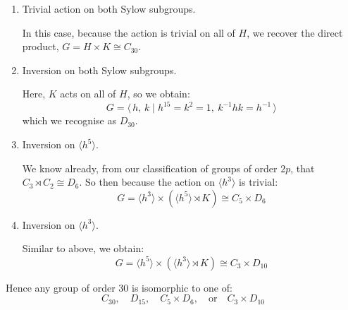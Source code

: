 \begin{enumerate}
    \item Trivial action on both Sylow subgroups.

        In this case, because the action is trivial on all of \(H\), we recover the direct product, \(G = H \times K
        \cong C_{30}\).

    \item Inversion on both Sylow subgroups.

        Here, \(K\) acts on all of \(H\), so we obtain:
        \[G = \langle\, h,\,k \mid h^{15} = k^2 = 1,\ k^{-1}hk = h^{-1}\,\rangle\]
        which we recognise as \(D_{30}\).

    \item Inversion on \(\langle h^5 \rangle\).

        We know already, from our classification of groups of order \(2p\), that \(C_3 \rtimes C_2 \cong D_6\).
        So then because the action on \(\langle h^3 \rangle\) is trivial:
        \[G = \langle h^3 \rangle \times (\langle h^5 \rangle \rtimes K) \cong C_5 \times D_6\]

    \item Inversion on \(\langle h^3 \rangle\).

        Similar to above, we obtain:
        \[G = \langle h^5 \rangle \times (\langle h^3 \rangle \rtimes K) \cong C_3 \times D_{10}\]
\end{enumerate}

Hence any group of order 30 is isomorphic to one of:
\[
    C_{30}, \quad%
    D_{15}, \quad%
    C_5 \times D_6, \quad \text{or} \quad%
    C_3 \times D_{10}
\]

